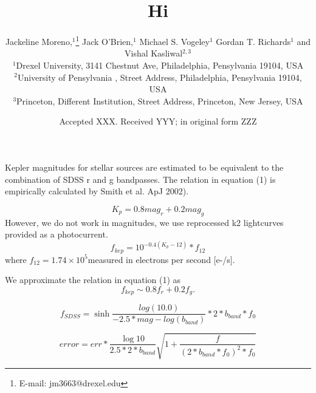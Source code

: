 \documentclass[a4paper,fleqn,usenatbib]{mnras}
\title{Hi}
\author{
	Jackeline Moreno,$^{1}$\thanks{E-mail: jm3663@drexel.edu}
	Jack O'Brien,$^{1}$
	Michael S. Vogeley$^{1}$
	Gordan T. Richards$^{1}$
	and	Vishal Kasliwal$^{2,3}$
	\\
	$^{1}$Drexel University, 3141 Chestnut Ave, Philadelphia, Pensylvania 19104, USA\\
	$^{2}$University of Pensylvania , Street Address, Philadelphia, Pensylvania 19104, USA\\
	$^{3}$Princeton, Different Institution, Street Address, Princeton, New Jersey, USA
}
\date{Accepted XXX. Received YYY; in original form ZZZ}
\begin{document}
\maketitle

 Kepler magnitudes for stellar sources are estimated to be equivalent to the combination of SDSS r and g  bandpasses.   The relation in equation (1) is empirically calculated by Smith et al. ApJ  2002).  
 
 \begin{equation}
 K_{p} = 0.8mag_{r}+0.2mag_{g}
 \end{equation}
 However, we do not work in magnitudes, we use reprocessed k2 lightcurves provided as a photocurrent.   
 \begin{equation}
 f_{kep} = 10^{-0.4(K_{p}-12)}*f_{12}
 \end{equation}
 where $f_{12} = 1.74 \times10^{5}$measured in electrons per second  [e-/s].
 
 We approximate the relation in equation (1) as 
 \begin{equation}
 f_{kep} \sim 0.8 f_{r} +0.2 f_{g}.
 \end{equation}
 
 
 
 \begin{equation}
 f_{SDSS}= \sinh{ \frac{log(10.0)}{-2.5*mag-log(b_{band})}}*2*b_{band}*f_{0}
 \end{equation}
 
 \begin{equation}
 error = err*\frac{\log{10}}{2.5*2*b_{band}} \sqrt{1+\frac{f}{(2*b_{band}*f_{0})^{2}*f_{0}}}
 \end{equation}
\end{document}
